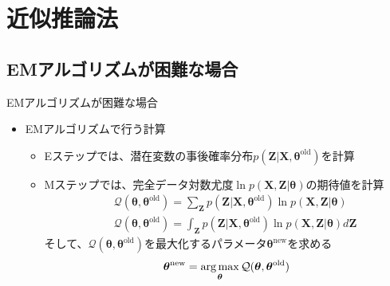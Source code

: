 \documentclass[dvipdfmx,notheorems,t]{beamer}
\begin{document}
\section{近似推論法}

\subsection{EMアルゴリズムが困難な場合}

\begin{frame}{EMアルゴリズムが困難な場合}

\begin{itemize}
	\item EMアルゴリズムで行う計算
	\begin{itemize}
		\item \alert{Eステップ}では、潜在変数の事後確率分布$p(\bm{Z} | \bm{X}, \bm{\theta}^\mathrm{old})$を計算
		\newline
		\item \alert{Mステップ}では、完全データ対数尤度$\ln p(\bm{X}, \bm{Z} | \bm{\theta})$の期待値を計算
		\begin{eqnarray}
			&& \mathcal{Q}(\bm{\theta}, \bm{\theta}^\mathrm{old}) = \sum_{\bm{Z}} p(\bm{Z} | \bm{X}, \bm{\theta}^\mathrm{old}) \ln p(\bm{X}, \bm{Z} | \bm{\theta}) \\
			&& \mathcal{Q}(\bm{\theta}, \bm{\theta}^\mathrm{old}) = \int_{\bm{Z}} p(\bm{Z} | \bm{X}, \bm{\theta}^\mathrm{old}) \ln p(\bm{X}, \bm{Z} | \bm{\theta}) d\bm{Z}
		\end{eqnarray}
		そして、$\mathcal{Q}(\bm{\theta}, \bm{\theta}^\mathrm{old})$を最大化するパラメータ$\bm{\theta}^\mathrm{new}$を求める
		\begin{equation}
			\bm{\theta}^\mathrm{new} = \operatorname*{arg\,max}_{\bm{\theta}} \mathcal{Q}(\bm{\theta}, \bm{\theta}^\mathrm{old})
		\end{equation}
	\end{itemize}
\end{itemize}

\end{frame}
\end{document}
